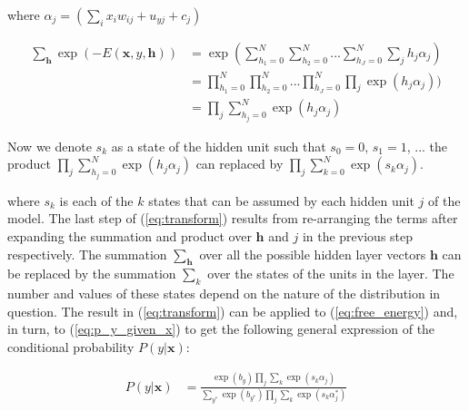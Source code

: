 \documentclass[review]{elsarticle}
\begin{document}
 where $\alpha_j = (\sum_i x_iw_{ij} + u_{yj} + c_j)$

\begin{equation}
  \begin{aligned}
  \sum_\mathbf{h}\exp(-E(\mathbf{x},y,\mathbf{h})) &= \exp(\sum_{h_1=0}^N\sum_{h_2=0}^N ... \sum_{h_J=0}^N \sum_{j} h_j \alpha_j)\\
                                                   &= \prod_{h_1=0}^N\prod_{h_2=0}^N ... \prod_{h_J=0}^N \prod_{j}\exp( h_j \alpha_j))\\
                                                   & = \prod_j\sum_{h_j=0}^N \exp(h_j \alpha_j)
  \end{aligned}
\end{equation}

Now we denote $s_k$ as a state of the hidden unit such that $s_0 = 0$, $s_1 = 1$, ... the product $\prod_j\sum_{h_j=0}^N \exp(h_j \alpha_j)$ can replaced by $\prod_j\sum_{k=0}^N \exp(s_k \alpha_j)$.

where $s_k$ is each of the $k$ states that can be assumed by each
hidden unit $j$ of the model. The last step of (\ref{eq:transform})
results from re-arranging the terms after expanding the summation and
product over $\mathbf{h}$ and $j$ in the previous step
respectively. The summation $\sum_\mathbf{h}$ over all the possible
hidden layer vectors $\mathbf{h}$ can be replaced by the summation
$\sum_k$ over the states of the units in the layer.  The number and
values of these states depend on the nature of the distribution in
question.  The result
in (\ref{eq:transform}) can be applied to (\ref{eq:free_energy}) and,
in turn, to (\ref{eq:p_y_given_x}) to get the following general
expression of the conditional probability $P(y|\mathbf{x})$:

\begin{equation*}
\begin{aligned}
P(y|\mathbf{x}) &= \frac{\exp\left(b_y\right) \prod_j \sum_k \exp\left(s_k
                \alpha_j\right)}{\sum_{y^{*}} \exp\left(b_{y^{*}}\right) 
                \prod_j \sum_k \exp\left(s_k \alpha^*_j\right)} 
\end{aligned}
\end{equation*}
\end{document}
